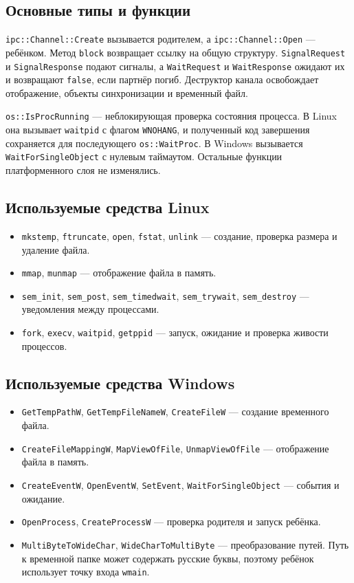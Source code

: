 \subsection{Основные типы и функции}
\texttt{ipc::Channel::Create} вызывается родителем, а \texttt{ipc::Channel::Open} --- ребёнком. Метод \texttt{block} возвращает ссылку на общую структуру. \texttt{SignalRequest} и \texttt{SignalResponse} подают сигналы, а \texttt{WaitRequest} и \texttt{WaitResponse} ожидают их и возвращают \texttt{false}, если партнёр погиб. Деструктор канала освобождает отображение, объекты синхронизации и временный файл.

\texttt{os::IsProcRunning} --- неблокирующая проверка состояния процесса. В Linux она вызывает \texttt{waitpid} с флагом \texttt{WNOHANG}, и полученный код завершения сохраняется для последующего \texttt{os::WaitProc}. В Windows вызывается \texttt{WaitForSingleObject} с нулевым таймаутом. Остальные функции платформенного слоя не изменялись.

\subsection{Используемые средства Linux}
\begin{itemize}
\item \texttt{mkstemp}, \texttt{ftruncate}, \texttt{open}, \texttt{fstat}, \texttt{unlink} --- создание, проверка размера и удаление файла.
\item \texttt{mmap}, \texttt{munmap} --- отображение файла в память.
\item \texttt{sem\_init}, \texttt{sem\_post}, \texttt{sem\_timedwait}, \texttt{sem\_trywait}, \texttt{sem\_destroy} --- уведомления между процессами.
\item \texttt{fork}, \texttt{execv}, \texttt{waitpid}, \texttt{getppid} --- запуск, ожидание и проверка живости процессов.
\end{itemize}

\subsection{Используемые средства Windows}
\begin{itemize}
\item \texttt{GetTempPathW}, \texttt{GetTempFileNameW}, \texttt{CreateFileW} --- создание временного файла.
\item \texttt{CreateFileMappingW}, \texttt{MapViewOfFile}, \texttt{UnmapViewOfFile} --- отображение файла в память.
\item \texttt{CreateEventW}, \texttt{OpenEventW}, \texttt{SetEvent}, \texttt{WaitForSingleObject} --- события и ожидание.
\item \texttt{OpenProcess}, \texttt{CreateProcessW} --- проверка родителя и запуск ребёнка.
\item \texttt{MultiByteToWideChar}, \texttt{WideCharToMultiByte} --- преобразование путей. Путь к временной папке может содержать русские буквы, поэтому ребёнок использует точку входа \texttt{wmain}.
\end{itemize}


